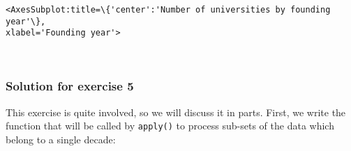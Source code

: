 \documentclass[10pt]{scrartcl}
\makeatletter
\newcommand{\boxspacing}{\kern\kvtcb@left@rule\kern\kvtcb@boxsep}
\newcommand{\prompt}[4]{
        {\ttfamily\llap{{\color{#2}[#3]:\hspace{3pt}#4}}\vspace{-\baselineskip}}
    }
\makeatother
\begin{document}
            \begin{tcolorbox}[breakable, size=fbox, boxrule=.5pt, pad at break*=1mm, opacityfill=0]
\prompt{Out}{outcolor}{49}{\boxspacing}
\begin{Verbatim}[commandchars=\\\{\}]
<AxesSubplot:title=\{'center':'Number of universities by founding year'\},
xlabel='Founding year'>
\end{Verbatim}
\end{tcolorbox}
        
    \begin{center}
    \end{center}
    { \hspace*{\fill} \\}
    
    \hypertarget{solution-for-exercise-5}{%
\subsubsection{Solution for exercise 5}\label{solution-for-exercise-5}}

This exercise is quite involved, so we will discuss it in parts. First,
we write the function that will be called by \texttt{apply()} to process
sub-sets of the data which belong to a single decade:
\end{document}

